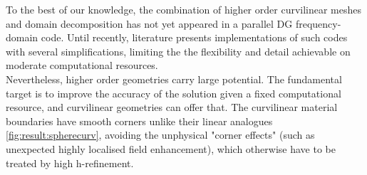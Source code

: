 \noindent
To the best of our knowledge, the combination of higher order curvilinear meshes and domain decomposition has not yet appeared in a parallel DG frequency-domain code. Until recently, literature presents implementations of such codes with several simplifications, limiting the the flexibility and detail achievable on moderate computational resources. \\

\noindent
Nevertheless, higher order geometries carry large potential. The fundamental target is to improve the accuracy of the solution given a fixed computational resource, and curvilinear geometries can offer that. The curvilinear material boundaries have smooth corners unlike their linear analogues \cref{fig:result:spherecurv}, avoiding the unphysical "corner effects" (such as unexpected highly localised field enhancement), which otherwise have to be treated by high h-refinement. \\

